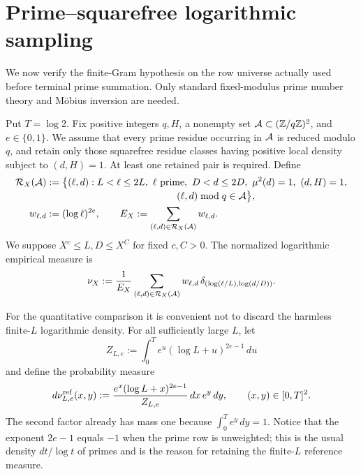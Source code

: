 \section{Prime--squarefree logarithmic sampling}
\label{sec:tpc51-arithmetic-sampling}

We now verify the finite-Gram hypothesis on the row universe actually
used before terminal prime summation.  Only standard fixed-modulus
prime number theory and M\"obius inversion are needed.

Put \(T=\log 2\).  Fix positive integers \(q,H\), a nonempty set
\(\mathcal A\subset(\mathbb Z/q\mathbb Z)^2\), and \(e\in\{0,1\}\).  We assume that every
prime residue occurring in \(\mathcal A\) is reduced modulo \(q\), and retain
only those squarefree residue classes having positive local density
subject to \((d,H)=1\).  At least one retained pair is required.  Define
\begin{align}
 \cR_X(\cA)
 &:=\bigl\{(\ell,d):L<\ell\leq2L,\ \ell\ {\rm prime},
       \ D<d\leq2D,\ \mu^2(d)=1,\ (d,H)=1,\notag\\[-2pt]
 &\hspace{47mm}(\ell,d)\bmod q\in\cA\bigr\},
 \label{eq:tpc51-row-universe}\\
 w_{\ell,d}&:=(\log\ell)^{2e},
 \qquad
 E_X:=\sum_{(\ell,d)\in\cR_X(\cA)}w_{\ell,d}.
 \label{eq:tpc51-row-base-energy}
\end{align}
We suppose \(X^c\leq L,D\leq X^C\) for fixed \(c,C>0\).  The normalized
logarithmic empirical measure is
\begin{equation}
 \nu_X:=\frac1{E_X}
 \sum_{(\ell,d)\in\mathcal R_X(\mathcal A)}
 w_{\ell,d}\,
 \delta_{(\log(\ell/L),\log(d/D))}.
 \label{eq:tpc51-empirical-measure}
\end{equation}

For the quantitative comparison it is convenient not to discard the
harmless finite-\(L\) logarithmic density.  For all sufficiently large
\(L\), let
\begin{equation}
 Z_{L,e}:=\int_0^T e^u(\log L+u)^{2e-1}\,du
 \label{eq:tpc51-prime-reference-normalizer}
\end{equation}
and define the probability measure
\begin{equation}
 d\nu_{L,e}^{\rm ref}(x,y)
 :=\frac{e^x(\log L+x)^{2e-1}}{Z_{L,e}}\,dx\,
   e^y\,dy,
 \qquad (x,y)\in[0,T]^2.
 \label{eq:tpc51-finite-reference-measure}
\end{equation}
The second factor already has mass one because
\(\int_0^T e^y\,dy=1\).  Notice that the exponent \(2e-1\) equals
\(-1\) when the prime row is unweighted; this is the usual density
\(dt/\log t\) of primes and is the reason for retaining the finite-\(L\)
reference measure.

